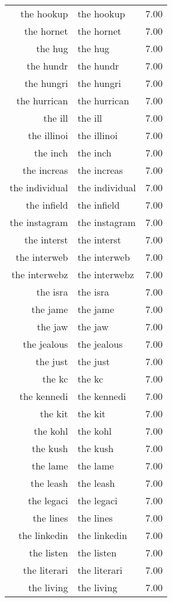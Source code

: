 \begin{table}[ht]
\begin{tabular}{rlr}
  the hookup & the hookup & 7.00 \\ 
  the hornet & the hornet & 7.00 \\ 
  the hug & the hug & 7.00 \\ 
  the hundr & the hundr & 7.00 \\ 
  the hungri & the hungri & 7.00 \\ 
  the hurrican & the hurrican & 7.00 \\ 
  the ill & the ill & 7.00 \\ 
  the illinoi & the illinoi & 7.00 \\ 
  the inch & the inch & 7.00 \\ 
  the increas & the increas & 7.00 \\ 
  the individual & the individual & 7.00 \\ 
  the infield & the infield & 7.00 \\ 
  the instagram & the instagram & 7.00 \\ 
  the interst & the interst & 7.00 \\ 
  the interweb & the interweb & 7.00 \\ 
  the interwebz & the interwebz & 7.00 \\ 
  the isra & the isra & 7.00 \\ 
  the jame & the jame & 7.00 \\ 
  the jaw & the jaw & 7.00 \\ 
  the jealous & the jealous & 7.00 \\ 
  the just & the just & 7.00 \\ 
  the kc & the kc & 7.00 \\ 
  the kennedi & the kennedi & 7.00 \\ 
  the kit & the kit & 7.00 \\ 
  the kohl & the kohl & 7.00 \\ 
  the kush & the kush & 7.00 \\ 
  the lame & the lame & 7.00 \\ 
  the leash & the leash & 7.00 \\ 
  the legaci & the legaci & 7.00 \\ 
  the lines & the lines & 7.00 \\ 
  the linkedin & the linkedin & 7.00 \\ 
  the listen & the listen & 7.00 \\ 
  the literari & the literari & 7.00 \\ 
  the living & the living & 7.00 \\ 

\end{tabular}
\end{table}
